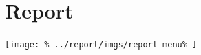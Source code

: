 \documentclass[../main/main]{subfiles}
\begin{document}
\newpage
\chapter{Report}
\texttt{[image: \%
  ../report/imgs/report-menu\%
]}
\end{document}
